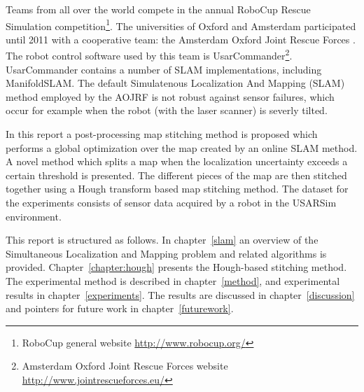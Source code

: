 Teams from all over the world compete in the annual RoboCup Rescue Simulation competition\footnote{RoboCup general website \url{http://www.robocup.org/}}. The universities of Oxford and Amsterdam participated until 2011 with a cooperative team: the Amsterdam Oxford Joint Rescue Forces \cite{aojrf2011, visser2012uva}. The robot control software used by this team is UsarCommander\footnote{Amsterdam Oxford Joint Rescue Forces website \url{http://www.jointrescueforces.eu/}}. UsarCommander contains a number of SLAM implementations, including ManifoldSLAM. The default Simulatenous Localization And Mapping (SLAM) method employed by the AOJRF is not robust against sensor failures, which occur for example when the robot (with the laser scanner) is severly tilted. 

In this report a post-processing map stitching method is proposed which performs a global optimization over the map created by an online SLAM method. A novel method which splits a map when the localization uncertainty exceeds a certain threshold is presented. The different pieces of the map are then stitched together using a Hough transform based map stitching method. The dataset for the experiments consists of sensor data acquired by a robot in the USARSim environment. 

This report is structured as follows. In chapter~\ref{slam} an overview of the Simultaneous Localization and Mapping problem and related algorithms is provided. Chapter~\ref{chapter:hough} presents the Hough-based stitching method. The experimental method is described in chapter~\ref{method}, and experimental results in chapter~\ref{experiments}. The results are discussed in chapter~\ref{discussion} and pointers for future work in chapter~\ref{futurework}.